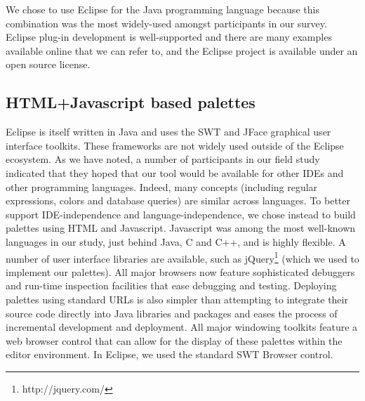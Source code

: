 \documentclass[10pt, conference, compsocconf]{IEEEtran}
\begin{document}
We chose to use Eclipse for the Java programming language because this combination was the most widely-used  amongst participants in our survey. Eclipse plug-in development is well-supported and there are many examples available online that we can refer to, and the Eclipse project is available under an open source license.

\subsection{HTML+Javascript based palettes}
Eclipse is itself written in Java and uses the SWT and JFace graphical user interface toolkits. These frameworks are not widely used outside of the Eclipse ecosystem. As we have noted, a number of participants in our field study indicated that they hoped that our tool would be available for other IDEs and other programming languages. Indeed, many concepts (including regular expressions, colors and database queries) are similar across languages. To better support IDE-independence and language-independence, we chose instead to build palettes using HTML and Javascript. Javascript was among the most well-known languages in our study, just behind Java, C and C++, and is highly flexible. A number of user interface libraries are available, such as jQuery\footnote{http://jquery.com/} (which we used to implement our palettes). All major browsers now feature sophisticated debuggers and run-time inspection facilities that ease debugging and testing. Deploying palettes using standard URLs is also simpler than attempting to integrate their source code directly into Java libraries and packages and eases the process of incremental development and deployment. All major windowing toolkits feature a web browser control that can allow for the display of these palettes within the editor environment. In Eclipse, we used the standard SWT Browser control. 
\end{document}
